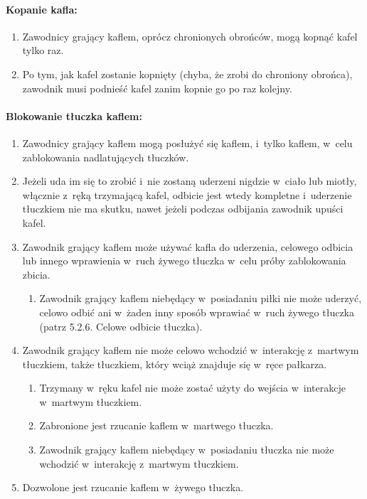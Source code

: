 \documentclass[12pt]{article}
\begin{document}
\paragraph{Kopanie kafla:}

\begin{enumerate}
	\item
	      Zawodnicy grający kaflem, oprócz chronionych obrońców, mogą kopnąć
	      kafel tylko raz.
	\item
	      Po tym, jak kafel zostanie kopnięty (chyba, że zrobi do chroniony
	      obrońca), zawodnik musi podnieść kafel zanim kopnie go po raz kolejny.
\end{enumerate}

\paragraph{Blokowanie tłuczka kaflem: }

\begin{enumerate}
	\item
	      Zawodnicy grający kaflem mogą posłużyć się kaflem, i~tylko kaflem, w~celu zablokowania nadlatujących tłuczków.
	\item
	      Jeżeli uda im się to zrobić i~nie zostaną uderzeni nigdzie w~ciało lub
	      miotły, włącznie z~ręką trzymającą kafel, odbicie jest wtedy kompletne
	      i~uderzenie tłuczkiem nie ma skutku, nawet jeżeli podczas odbijania
	      zawodnik upuści kafel.
	\item
	      Zawodnik grający kaflem może używać kafla do uderzenia, celowego
	      odbicia lub innego wprawienia w~ruch żywego tłuczka w~celu próby
	      zablokowania zbicia.

	      \begin{enumerate}
		      \item
		            Zawodnik grający kaflem niebędący w~posiadaniu piłki nie może
		            uderzyć, celowo odbić ani w~żaden inny sposób wprawiać w~ruch żywego
		            tłuczka (patrz 5.2.6. Celowe odbicie tłuczka).
	      \end{enumerate}
	\item
	      Zawodnik grający kaflem nie może celowo wchodzić w~interakcję z~martwym tłuczkiem, także tłuczkiem, który wciąż znajduje się w~ręce
	      pałkarza.

	      \begin{enumerate}
		      \item
		            Trzymany w~ręku kafel nie może zostać użyty do wejścia w~interakcje
		            w~martwym tłuczkiem.
		      \item
		            Zabronione jest rzucanie kaflem w~martwego tłuczka.
		      \item
		            Zawodnik grający kaflem niebędący w~posiadaniu tłuczka nie może
		            wchodzić w~interakcję z~martwym tłuczkiem.
	      \end{enumerate}
	\item
	      Dozwolone jest rzucanie kaflem w~żywego tłuczka.
\end{enumerate}
\end{document}
